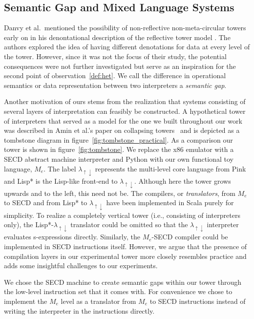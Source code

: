 \documentclass[sigplan,anonymous,review]{acmart}
\newcommand{\mslang}{$\lambda_{\uparrow\downarrow}$}
\newcommand{\mevl}{$M_{e}$}
\theoremstyle{definition}
\begin{document}
\subsection{Semantic Gap and Mixed Language Systems}
Danvy et al.~mentioned the possibility of non-reflective non-meta-circular towers early on in his denontational description of the reflective tower model \cite{danvy1988intensions}. The authors explored the idea of having different denotations for data at every level of the tower. However, since it was not the focus of their study, the potential consequences were not further investigated but serve as an inspiration for the second point of observation~\ref{def:het}. We call the difference in operational semantics or data representation between two interpreters a \textit{semantic gap}.

Another motivation of ours stems from the realization that systems consisting of several layers of interpretation can feasibly be constructed. A hypothetical tower of interpreters that served as a model for the one we built throughout our work was described in Amin et al.'s paper on collapsing towers~\cite{amin2017collapsing} and is depicted as a tombstone diagram in figure~\ref{fig:tombstone_practical}. As a comparison our tower is shown in figure~\ref{fig:tombstone}. We replace the x86 emulator with a SECD abstract machine interpreter and Python with our own functional toy language, \mevl. The label \mslang{} represents the multi-level core language from Pink~\cite{amin2017collapsing} and Lisp* is the Lisp-like front-end to \mslang. Although here the tower grows upwards and to the left, this need not be. The compilers, or \textit{translators}, from \mevl{} to SECD and from Lisp* to \mslang{} have been implemented in Scala purely for simplicity. To realize a completely vertical tower (i.e., consisting of interpreters only), the Lisp*-\mslang{} translator could be omitted so that the \mslang{} interpreter evaluates s-expressions directly. Similarly, the \mevl-SECD compiler could be implemented in SECD instructions itself. However, we argue that the presence of compilation layers in our experimental tower more closely resembles practice and adds some insightful challenges to our experiments.

We chose the SECD machine to create semantic gaps within our tower through the low-level instruction set that it comes with. For convenience we chose to implement the \mevl{} level as a translator from \mevl{} to SECD instructions instead of writing the interpreter in the instructions directly.
\end{document}
